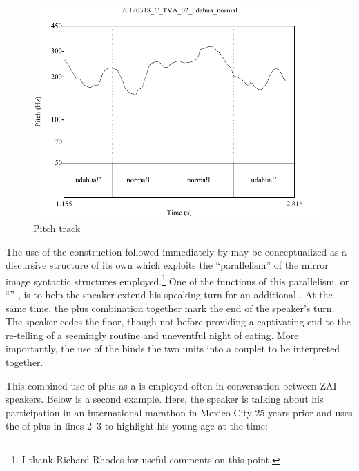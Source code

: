  \begin{figure} 
\caption{Pitch track}
\label{fig:5:gudahuanormal}
 
\includegraphics[height=.4\textheight]{gudahuanormal}
 \end{figure}


The use of the  construction followed immediately by  may be conceptualized as a discursive structure of its own which exploits the ``parallelism'' \citep{jakobson1966,fox1977} of the mirror image syntactic structures employed.\footnote{I thank Richard Rhodes for useful comments on this point.} One of the functions of this parallelism, or ``'' \citep{silverstein1984}, is to help the speaker extend his speaking turn for an additional . At the same time, the  plus  combination together mark the end of the speaker's turn. The speaker cedes the floor, though not before providing a captivating end to the re-telling of a seemingly routine and uneventful night of eating. More importantly, the use of the  binds the two  units into a couplet to be interpreted together.

This combined use of  plus  as a  is employed often in conversation between ZAI speakers. Below is a second example. Here, the speaker is talking about his participation in an international marathon in Mexico City 25 years prior and uses the  of  plus  in lines 2--3 to highlight his young age at the time:

